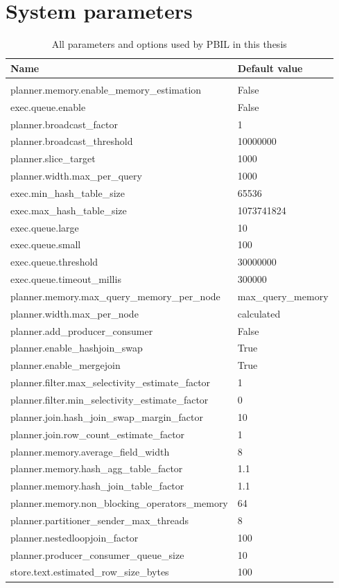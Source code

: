 \documentclass[a4paper,english]{report}
\begin{document}
\chapter{System parameters}
\label{system_params}
\begin{table}[H]
	\centering
	\caption{All parameters and options used by PBIL in this thesis}
	\label{table:added_params}
	\begin{tabular}{ll}
		\\
		\multicolumn{1}{l}{\bfseries Name} & \multicolumn{1}{l}{\bfseries Default value} \\ \hline \\
		planner.memory.enable\_memory\_estimation & False  \\
		exec.queue.enable & False  \\
		planner.broadcast\_factor & 1  \\
		planner.broadcast\_threshold & 10000000  \\
		planner.slice\_target & 1000  \\
		planner.width.max\_per\_query & 1000  \\
		exec.min\_hash\_table\_size & 65536  \\
		exec.max\_hash\_table\_size & 1073741824  \\
		exec.queue.large & 10  \\
		exec.queue.small & 100  \\
		exec.queue.threshold & 30000000  \\
		exec.queue.timeout\_millis & 300000  \\
		planner.memory.max\_query\_memory\_per\_node &  max\_query\_memory  \\
		planner.width.max\_per\_node & calculated  \\
		planner.add\_producer\_consumer & False  \\
		planner.enable\_hashjoin\_swap & True  \\
		planner.enable\_mergejoin & True  \\
		planner.filter.max\_selectivity\_estimate\_factor & 1  \\
		planner.filter.min\_selectivity\_estimate\_factor & 0  \\
		planner.join.hash\_join\_swap\_margin\_factor & 10  \\
		planner.join.row\_count\_estimate\_factor & 1  \\
		planner.memory.average\_field\_width & 8  \\
		planner.memory.hash\_agg\_table\_factor & 1.1  \\
		planner.memory.hash\_join\_table\_factor & 1.1  \\
		planner.memory.non\_blocking\_operators\_memory & 64  \\
		planner.partitioner\_sender\_max\_threads & 8  \\
		planner.nestedloopjoin\_factor & 100  \\
		planner.producer\_consumer\_queue\_size & 10  \\
		store.text.estimated\_row\_size\_bytes & 100  \\
	\end{tabular}
\end{table}
\end{document}
